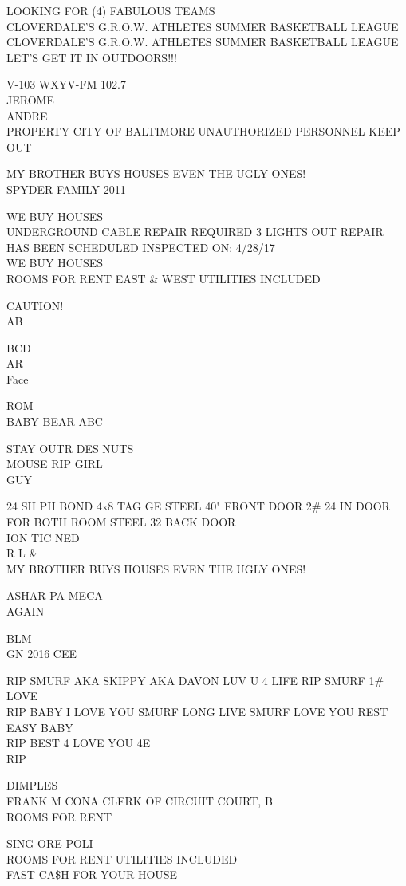 \documentclass[10pt,letterpaper]{article}
\begin{document}
LOOKING FOR (4) FABULOUS TEAMS\\
CLOVERDALE'S G.R.O.W. ATHLETES SUMMER BASKETBALL LEAGUE\\
CLOVERDALE'S G.R.O.W. ATHLETES SUMMER BASKETBALL LEAGUE LET'S GET IT IN OUTDOORS!!!

V{-}103 WXYV{-}FM 102.7\\
JEROME\\
ANDRE\\
PROPERTY CITY OF BALTIMORE UNAUTHORIZED PERSONNEL KEEP OUT

MY BROTHER BUYS HOUSES EVEN THE UGLY ONES!\\
SPYDER FAMILY 2011

WE BUY HOUSES\\
UNDERGROUND CABLE REPAIR REQUIRED 3 LIGHTS OUT REPAIR HAS BEEN SCHEDULED INSPECTED ON: 4/28/17\\
WE BUY HOUSES\\
ROOMS FOR RENT EAST \& WEST UTILITIES INCLUDED

CAUTION!\\
AB

BCD\\
AR\\
Face

ROM\\
BABY BEAR ABC

STAY OUTR DES NUTS\\
MOUSE RIP GIRL\\
GUY

24 SH PH BOND 4x8 TAG GE STEEL 40" FRONT DOOR 2\# 24 IN DOOR FOR BOTH ROOM STEEL 32 BACK DOOR\\
ION TIC NED\\
R L \&\\
MY BROTHER BUYS HOUSES EVEN THE UGLY ONES!

ASHAR PA MECA\\
AGAIN

BLM\\
GN 2016 CEE

RIP SMURF AKA SKIPPY AKA DAVON LUV U 4 LIFE RIP SMURF 1\# LOVE\\
RIP BABY I LOVE YOU SMURF LONG LIVE SMURF LOVE YOU REST EASY BABY\\
RIP BEST 4 LOVE YOU 4E\\
RIP

DIMPLES\\
FRANK M CONA CLERK OF CIRCUIT COURT, B\\
ROOMS FOR RENT

SING ORE POLI\\
ROOMS FOR RENT UTILITIES INCLUDED\\
FAST CA\$H FOR YOUR HOUSE
\end{document}
